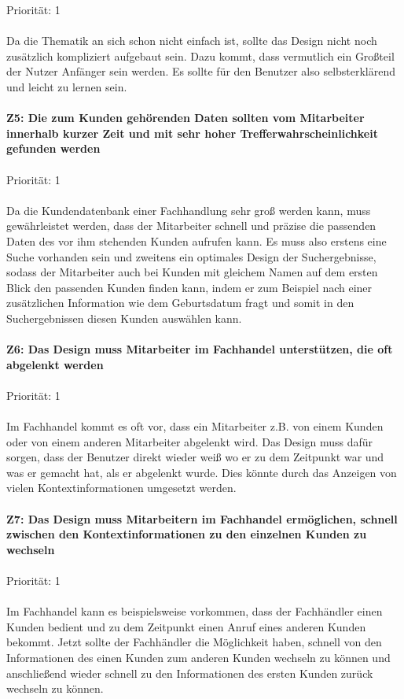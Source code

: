 Priorität: 1
\\ \\
Da die Thematik an sich schon nicht einfach ist, sollte das Design nicht noch zusätzlich kompliziert aufgebaut sein. Dazu kommt, dass vermutlich ein Großteil der Nutzer Anfänger sein werden. Es sollte für den Benutzer also selbsterklärend und leicht zu lernen sein. 
\\ \\
\textbf{Z5: Die zum Kunden gehörenden Daten sollten vom Mitarbeiter innerhalb kurzer Zeit und mit sehr hoher Trefferwahrscheinlichkeit gefunden werden}
\\ \\
Priorität: 1
\\ \\
Da die Kundendatenbank einer Fachhandlung sehr groß werden kann, muss gewährleistet werden, dass der Mitarbeiter schnell und präzise die passenden Daten des vor ihm stehenden Kunden aufrufen kann. Es muss also erstens eine Suche vorhanden sein und zweitens ein optimales Design der Suchergebnisse, sodass der Mitarbeiter auch bei Kunden mit gleichem Namen auf dem ersten Blick den passenden Kunden finden kann, indem er zum Beispiel nach einer zusätzlichen Information wie dem Geburtsdatum fragt und somit in den Suchergebnissen diesen Kunden auswählen kann.
\\ \\
\textbf{Z6: Das Design muss Mitarbeiter im Fachhandel unterstützen, die oft abgelenkt werden}
\\ \\
Priorität: 1
\\ \\
Im Fachhandel kommt es oft vor, dass ein Mitarbeiter z.B. von einem Kunden oder von einem anderen Mitarbeiter abgelenkt wird. Das Design muss dafür sorgen, dass der Benutzer direkt wieder weiß wo er zu dem Zeitpunkt war und was er gemacht hat, als er abgelenkt wurde. Dies könnte durch das Anzeigen von vielen Kontextinformationen umgesetzt werden.
\\ \\
\textbf{Z7: Das Design muss Mitarbeitern im Fachhandel ermöglichen, schnell zwischen den Kontextinformationen zu den einzelnen Kunden zu wechseln}
\\ \\
Priorität: 1
\\ \\
Im Fachhandel kann es beispielsweise vorkommen, dass der Fachhändler einen Kunden bedient und zu dem Zeitpunkt einen Anruf eines anderen Kunden bekommt. Jetzt sollte der Fachhändler die Möglichkeit haben, schnell von den Informationen des einen Kunden zum anderen Kunden wechseln zu können und anschließend wieder schnell zu den Informationen des ersten Kunden zurück wechseln zu können.
